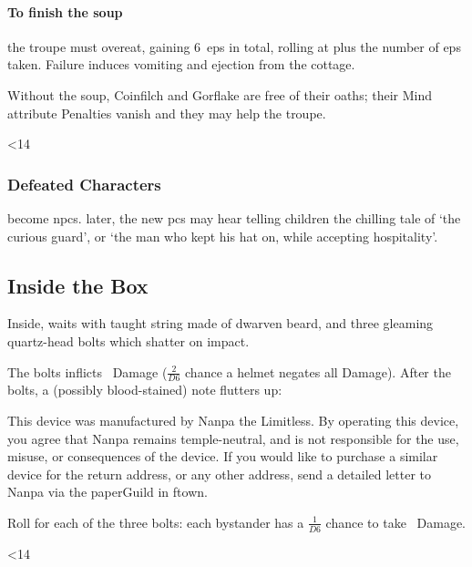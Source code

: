 \documentclass[10pt,twoside]{book}
\begin{document}

\paragraph{To finish the soup}
the troupe must overeat, gaining 6~\glspl{ep} in total, rolling  at \tn[8] plus the number of \glspl{ep} taken.
Failure induces vomiting and ejection from the cottage.

Without the soup, Coinfilch and Gorflake are free of their oaths; their Mind \gls{attribute} Penalties vanish and they may help the troupe.

\ifnum\thepage<14
  \subsubsection{Defeated Characters}
  become \glspl{npc}.
   later, the new \glspl{pc} may hear  telling children the chilling tale of `the curious \gls{guard}', or `the man who kept his hat on, while accepting hospitality'.
\fi

\subsection{Inside the Box}
\label{insideTheBox}

Inside,  waits with taught string made of dwarven beard, and three gleaming quartz-head bolts which shatter on impact.

The bolts inflicts ~Damage ({$\frac{2}{D6}$} chance a helmet negates all Damage).
After the bolts, a (possibly blood-stained) note flutters up:

\begin{speechtext}
  This device was manufactured by Nanpa the Limitless.
  By operating this device, you agree that Nanpa remains \gls{temple}-neutral, and is not responsible for the use, misuse, or consequences of the device.
  If you would like to purchase a similar device for the return address, or any other address, send a detailed letter to Nanpa via the \gls{paperGuild} in \gls{ftown}.
\end{speechtext}


Roll for each of the three bolts: each bystander has a $\frac{1}{D6}$ chance to take ~Damage.

\ifnum\thepage<14
  \clearpage\null
\fi
\end{document}
